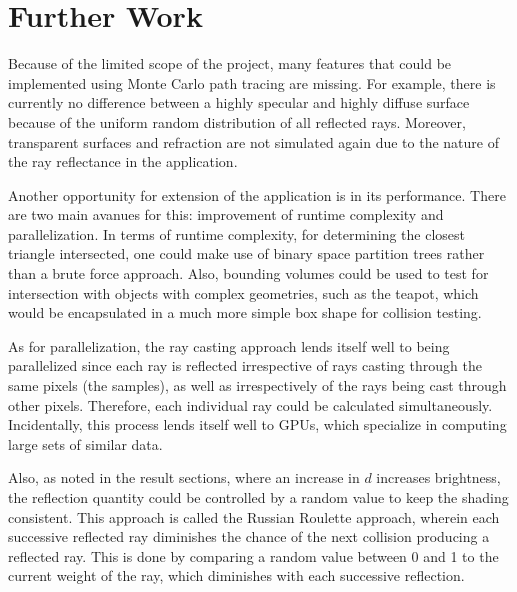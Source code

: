 \documentclass[12pt,journal]{IEEEtran}
\begin{document}
\section{Further Work}
Because of the limited scope of the project, many features that could be implemented using Monte Carlo path tracing are missing. For example, there is currently no difference between a highly specular and highly diffuse surface because of the uniform random distribution of all reflected rays. Moreover, transparent surfaces and refraction are not simulated again due to the nature of the ray reflectance in the application.

\par
Another opportunity for extension of the application is in its performance. There are two main avanues for this: improvement of runtime complexity and parallelization. In terms of runtime complexity, for determining the closest triangle intersected, one could make use of binary space partition trees rather than a brute force approach. Also, bounding volumes could be used to test for intersection with objects with complex geometries, such as the teapot, which would be encapsulated in a much more simple box shape for collision testing.

\par
As for parallelization, the ray casting approach lends itself well to being parallelized since each ray is reflected irrespective of rays casting through the same pixels (the samples), as well as irrespectively of the rays being cast through other pixels. Therefore, each individual ray could be calculated simultaneously. Incidentally, this process lends itself well to GPUs, which specialize in computing large sets of similar data.

\par
Also, as noted in the result sections, where an increase in $d$ increases brightness, the reflection quantity could be controlled by a random value to keep the shading consistent. This approach is called the Russian Roulette approach, wherein each successive reflected ray diminishes the chance of the next collision producing a reflected ray. This is done by comparing a random value between 0 and 1 to the current weight of the ray, which diminishes with each successive reflection.

\end{document}

